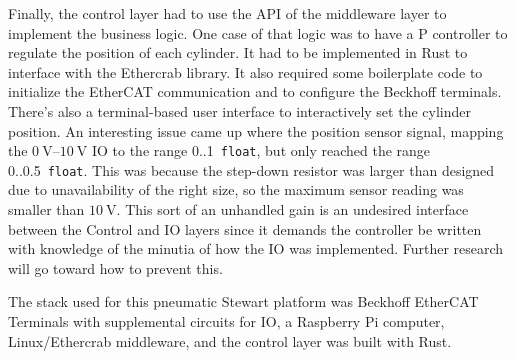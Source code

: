 \documentclass[english,12pt,a4paper,pdftex,eng,utf8]{aaltothesis}
\begin{document}
Finally, the control layer had to use the API of the middleware layer to implement the business logic.  One case of that logic was to have a P controller to regulate the position of each cylinder.  It had to be implemented in Rust to interface with the Ethercrab library.  It also required some boilerplate code to initialize the EtherCAT communication and to configure the Beckhoff terminals.  There's also a terminal-based user interface to interactively set the cylinder position.  An interesting issue came up where the position sensor signal, mapping the  $\qtyrange[range-units=single,range-phrase=..]{0}{10}{\volt}$ IO to the range 0..1~\verb|float|, but only reached the range 0..0.5~\verb|float|.  This was because the step-down resistor was larger than designed due to unavailability of the right size, so the maximum sensor reading was smaller than $\qty{10}{\volt}$.  This sort of an unhandled gain is an undesired interface between the Control and IO layers since it demands the controller be written with knowledge of the minutia of how the IO was implemented.  Further research will go toward how to prevent this.

The stack used for this pneumatic Stewart platform was Beckhoff EtherCAT Terminals with supplemental circuits for IO, a Raspberry Pi computer, Linux/Ethercrab middleware, and the control layer was built with Rust.





\end{document}
